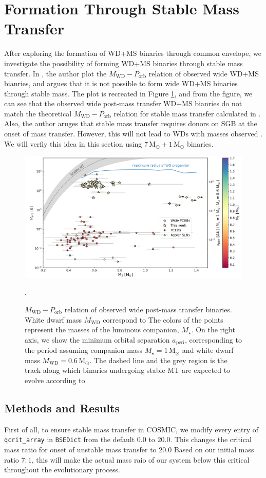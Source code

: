 \documentclass[12pt]{article}
\newcommand{\Msun}{\,\mathrm{M_{\odot}}}
\newcommand{\MWD}{M_{\mathrm{WD}}}
\newcommand{\Mstar}{M_{\star}}
\newcommand{\Porb}{P_{\mathrm{orb}}}
\begin{document}
\section{Formation Through Stable Mass Transfer} \label{sec:stable}

After exploring the formation of WD+MS binaries through common envelope, we investigate the possibility of forming WD+MS binaries through stable mass transfer. In \cite{yamaguchi_lo}, the author plot the $\MWD - \Porb$ relation of observed wide WD+MS bianries, and argues that it is not possible to form wide WD+MS binaries through stable mass. The plot is recreated in Figure \ref{theory-observed}, and from the figure, we can see that the observed wide post-mass transfer WD+MS bianries do not match the theoretical $\MWD - \Porb$ relation for stable mass transfer calculated in \cite{rappaport1995relation}. Also, the author aruges that stable mass transfer requires donors on SGB at the onset of mass transfer. However, this will not lead to WDs with masses observed \cite{yamaguchi_lo}. We will verfiy this idea in this section using $7\Msun + 1 \Msun$ binaries.

\begin{figure}
  \centering
  \includegraphics[width=0.8\linewidth]{fig/theory-observed.png}
  \caption{$M_{\mathrm{WD}} - P_{\mathrm{orb}}$ relation of observed wide post-mass transfer binaries. White dwarf mass $\MWD$ correspond to The colors of the points represent the masses of the luminous companion, $\Mstar$. On the right axis, we show the minimum orbital separation $a_{\mathrm{peri}}$, corresponding to the period assuming companion mass $\Mstar = 1 \Msun$ and white dwarf mass $\MWD = 0.6 \Msun$. The dashed line and the grey region is the track along which binaries undergoing stable MT are expected to evolve according to \cite{rappaport1995relation}}.
  \label{theory-observed}
\end{figure}

\subsection{Methods and Results}
First of all, to ensure stable mass transfer in COSMIC, we modify every entry of \verb|qcrit_array| in \verb|BSEDict| from the default $0.0$ to $20.0$. This changes the critical mass ratio for onset of unstable mass transfer to $20.0$ Based on our initial mass ratio $7:1$, this will make the actual mass raio of our system below this critical throughout the evolutionary process.
\end{document}
